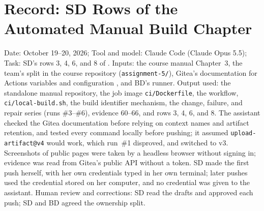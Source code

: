 \section{Record: SD Rows of the Automated Manual Build Chapter}
Date: October 19--20, 2026; Tool and model: Claude Code (Claude Opus 5.5);
Task: SD's rows 3, 4, 6, and 8 of . Inputs: the
course manual \cite{DosManual} Chapter~3, the team's split in the course
repository (\texttt{assignment-5/}), Gitea's documentation for Actions
variables and configuration \cite{GiteaActionsVars,GiteaConfigActions}, and
BD's runner. Output used: the standalone manual repository, the job image
\texttt{ci/Dockerfile}, the workflow, \texttt{ci/local-build.sh}, the build
identifier mechanism, the change, failure, and repair series (runs \#3--\#6),
evidence 60--66, and rows 3, 4, 6, and 8. The assistant checked the Gitea
documentation before relying on context names and artifact retention, and
tested every command locally before pushing; it assumed
\texttt{upload-artifact@v4} would work, which run~\#1 disproved, and switched
to v3. Screenshots of public pages were taken by a headless browser without
signing in; evidence was read from Gitea's public API without a token. SD
made the first push herself, with her own credentials typed in her own
terminal; later pushes used the credential stored on her computer, and no
credential was given to the assistant. Human review and corrections: SD read
the drafts and approved each push; SD and BD agreed the ownership split.

